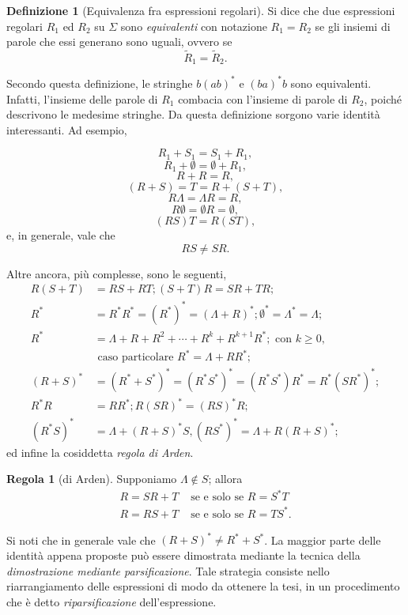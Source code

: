 \documentclass[10pt]{\classname}
\theoremstyle{definition}
\newtheorem{definizione}{Definizione}[section]
\theoremstyle{definition}
\newtheorem{regola}{Regola}[section]
\theoremstyle{definition}
\theoremstyle{definition}
\begin{document}
\begin{definizione}[Equivalenza fra espressioni regolari]
Si dice che due espressioni regolari $R_1$ ed $R_2$ su $\Sigma$ sono \emph{equivalenti} con notazione $R_1 = R_2$ se gli insiemi di parole che essi generano sono uguali, ovvero se \[\tilde R_1 = \tilde R_2.\]
\end{definizione}

Secondo questa definizione, le stringhe $b(ab)^*$ e $(ba)^* b$ sono equivalenti. Infatti, l'insieme delle parole di $R_1$ combacia con l'insieme di parole di $R_2$, poiché descrivono le medesime stringhe. Da questa definizione sorgono varie identità interessanti. Ad esempio,

\[  R_1 +  S_1 =  S_1 +  R_1,\]
\[  R_1 + \emptyset = \emptyset +  R_1,\]
\[  R +  R =  R,\]
\[ ( R +  S) =  T =  R + ( S +  T),\]
\[ R \Lambda  = \Lambda  R =  R,\]
\[ R \emptyset  = \emptyset  R = \emptyset,\]
\[( R  S)  T  =  R (  S  T),\]
e,  in generale, vale che
\[ R  S \neq  S  R.\]

Altre ancora, più complesse, sono le seguenti, 
\begin{align*}
    R(S + T) &= RS + RT;  (S + T)R = SR + TR; \\
    R^* &= R^* R^* = (R^*)^* = (\Lambda + R)^*; \emptyset^* = \Lambda^* = \Lambda; \\
    R^* &= \Lambda + R + R^2 + \cdots + R^k + R^{k+1}R^*; \mbox{ con } k \geq 0, \\
        &  \mbox{ caso particolare } R^* = \Lambda + RR^*; \\
    (R+S)^* &= (R^* + S^*)^* = (R^* S^*)^*  = (R^* S^*)R^* = R^*(SR^*)^*; \\
    R^* R &= RR^*;  R(SR)^* = (RS)^*R; \\
    (R^*S)^* &= \Lambda  + (R + S)^*S, (RS^*)^* =\Lambda + R(R + S)^*;
\end{align*}
ed infine la cosiddetta \emph{regola di Arden}.

\begin{regola}[di Arden] Supponiamo $\Lambda \notin S$; allora
    \begin{align*}
        R = SR + T & \mbox{ se e solo se } R = S^* T \\
        R = RS + T & \mbox{ se e solo se } R = T S^*.
    \end{align*}
\end{regola}

Si noti che in generale vale che $(R + S)^* \neq R^* + S^*$. La maggior parte
delle identità appena proposte può essere dimostrata mediante la tecnica della
\emph{dimostrazione mediante parsificazione}. Tale strategia consiste nello
riarrangiamento delle espressioni di modo da ottenere la tesi, in un
procedimento che è detto \emph{riparsificazione} dell'espressione.
\end{document}
